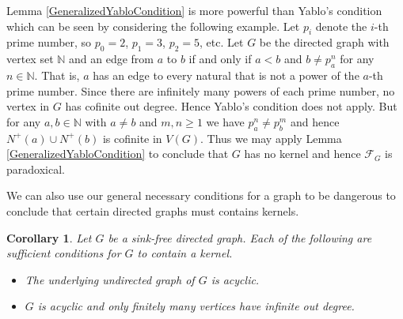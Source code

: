 \documentclass[12pt]{article}
\newtheorem{cor}[thm]{Corollary}
\theoremstyle{remark}
\newcommand{\fancy}[1]{\mathcal{#1}}
\def\F{\fancy{F}}
\def\F{\fancy{F}}
\begin{document}
Lemma \ref{GeneralizedYabloCondition} is more powerful than Yablo's condition which can be seen by considering the following example.  Let $p_i$ denote the $i$-th prime number, so $p_0 = 2$, $p_1 = 3$, $p_2 = 5$, etc.  Let $G$ be the directed graph with vertex set $\mathbb{N}$ and an edge from $a$ to $b$ if and only if $a < b$ and $b \neq p_a^n$ for any $n \in \mathbb{N}$.  That is, $a$ has an edge to every natural that is not a power of the $a$-th prime number.  Since there are infinitely many powers of each prime number, no vertex in $G$ has cofinite out degree.  Hence Yablo's condition does not apply.  But for any $a, b \in \mathbb{N}$ with $a \neq b$ and $m, n \geq 1$ we have $p_a^n \neq p_b^m$ and hence $N^+(a) \cup N^+(b)$ is cofinite in $V(G)$.  Thus we may apply Lemma \ref{GeneralizedYabloCondition} to conclude that $G$ has no kernel and hence $\F_G$ is paradoxical.\newline

We can also use our general necessary conditions for a graph to be dangerous to conclude that certain directed graphs must contains kernels.

\begin{cor}
Let $G$ be a sink-free directed graph.  Each of the following are sufficient conditions for $G$ to contain a kernel.
\begin{itemize}
\item The underlying undirected graph of $G$ is acyclic.
\item $G$ is acyclic and only finitely many vertices have infinite out degree.
\end{itemize}
\end{cor}




\end{document}

